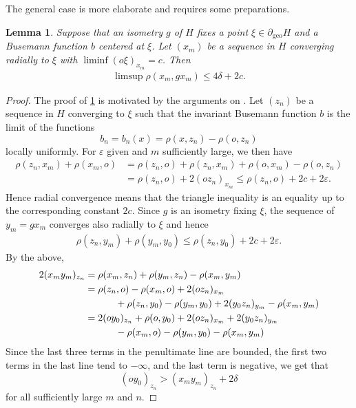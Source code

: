 \documentclass[12pt,a4paper]{amsart}
\numberwithin{equation}{section}
\newtheorem{lem}[equation]{Lemma}
\theoremstyle{definition}
\DeclareMathOperator{\geo}{geo}
\def\ve{\varepsilon}
\begin{document}
The general case is more elaborate and requires some preparations.

\begin{lem}\label{4d2c}
Suppose that an isometry $g$ of $H$ fixes a point $\xi\in\partial_{\geo}H$  and a Busemann function $b$ centered at $\xi$.
Let $(x_m)$ be a sequence in $H$  converging radially to $\xi$ with $\liminf(o\xi)_{x_m}=c$.
Then
\begin{align*}
    \limsup\rho(x_m,gx_m)\le4\delta+2c.
\end{align*}
\end{lem}

\begin{proof}
The proof of \cref{4d2c} is motivated by the arguments on \cite[top of p.\,42]{GH}. 
Let $(z_n)$ be a sequence in $H$ converging to $\xi$ such that the invariant Busemann function $b$ is the limit of the functions \[b_n=b_n(x)=\rho(x,z_n)-\rho(o,z_n)\] locally uniformly.
For $\ve$ given and $m$ sufficiently large, we then have
\begin{align*}
	\rho(z_n,x_m) + \rho(x_m,o)
	&= \rho(z_n,o) + \rho(z_n,x_m) + \rho(o,x_m) - \rho(o,z_n) \\
	&= \rho(z_n,o) + 2(oz_n)_{x_m}  \le \rho(z_n,o) + 2c + 2\ve.
\end{align*}
Hence radial convergence means that the triangle inequality is an equality up to the corresponding constant $2c$.
Since $g$ is an isometry fixing $\xi$, the sequence of $y_m=gx_m$ converges also radially to $\xi$ and hence
\begin{align*}
	\rho(z_n,y_m) + \rho(y_m,y_0)
	\le \rho(z_n,y_0) + 2c + 2\ve.
\end{align*}
By the above,
\begin{align*}
	2(x_my_m)_{z_n} &= \rho(x_m,z_n) + \rho(y_m,z_n) - \rho(x_m,y_m) \\
    &= \rho(z_n,o) - \rho(x_m,o) + 2(oz_n)_{x_m} \\
    &\hspace{11mm}+ \rho(z_n,y_0) - \rho(y_m,y_0) + 2(y_0z_n)_{y_m}  - \rho(x_m,y_m) \\
    &= 2(oy_0)_{z_n} + \rho(o,y_0) + 2(oz_n)_{x_m} + 2(y_0z_n)_{y_m} \\
    &\hspace{11mm}- \rho(x_m,o) - \rho(y_m,y_0) - \rho(x_m,y_m) 
\end{align*}
Since the last three terms in the penultimate line are bounded, the first two terms in the last line tend to $-\infty$, and the last term is negative,
we get that \[(oy_0)_{z_n}>(x_my_m)_{z_n}+2\delta\] for all sufficiently large $m$ and $n$.

\end{proof}
\end{document}
